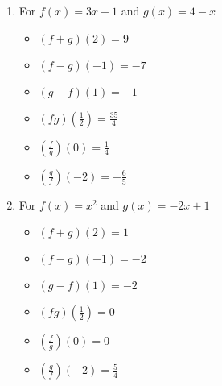 \begin{enumerate}

\item For  $f(x) = 3x+1$ and $g(x) = 4-x$

\begin{multicols}{3}
\begin{itemize}

\item  $(f+g)(2) = 9$
\item  $(f-g)(-1) = -7$
\item  $(g-f)(1) = -1$

\end{itemize}
\end{multicols}

\begin{multicols}{3}
\begin{itemize}

\item  $(fg)\left(\frac{1}{2}\right) = \frac{35}{4}$
\item  $\left(\frac{f}{g}\right)(0) = \frac{1}{4}$
\item  $\left(\frac{g}{f}\right)\left(-2\right) = -\frac{6}{5}$

\end{itemize}
\end{multicols}

\item For  $f(x) = x^2$ and $g(x) = -2x+1$

\begin{multicols}{3}
\begin{itemize}

\item  $(f+g)(2) = 1$
\item  $(f-g)(-1) = -2$
\item  $(g-f)(1) = -2$

\end{itemize}
\end{multicols}

\begin{multicols}{3}
\begin{itemize}

\item  $(fg)\left(\frac{1}{2}\right) = 0$
\item  $\left(\frac{f}{g}\right)(0) = 0$
\item  $\left(\frac{g}{f}\right)\left(-2\right) = \frac{5}{4}$

\end{itemize}
\end{multicols}


\end{enumerate}
